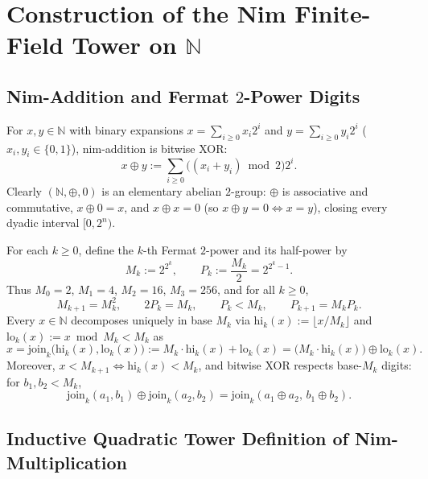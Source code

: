 \documentclass[11pt]{article}
\theoremstyle{definition}
\theoremstyle{remark}
\newcommand{\nimadd}{\oplus}
\newcommand{\N}{\mathbb{N}}
\begin{document}
\section{Construction of the Nim Finite-Field Tower on \texorpdfstring{$\N$}{N}}

\subsection{Nim-Addition and Fermat \texorpdfstring{$2$}{2}-Power Digits}

For $x, y \in \N$ with binary expansions $x = \sum_{i \ge 0} x_i 2^i$ and $y = \sum_{i \ge 0} y_i 2^i$ ($x_i, y_i \in \{0,1\}$), nim-addition is bitwise XOR:
\[
  x \nimadd y := \sum_{i \ge 0} \bigl((x_i + y_i) \bmod 2\bigr) 2^i.
\]
Clearly $(\N, \nimadd, 0)$ is an elementary abelian $2$-group: $\nimadd$ is associative and commutative, $x \nimadd 0 = x$, and $x \nimadd x = 0$ (so $x \nimadd y = 0 \iff x = y$), closing every dyadic interval $[0, 2^n)$.

For each $k \ge 0$, define the $k$-th Fermat $2$-power and its half-power by
\[
  M_k := 2^{2^k}, \qquad P_k := \frac{M_k}{2} = 2^{2^k - 1}.
\]
Thus $M_0 = 2$, $M_1 = 4$, $M_2 = 16$, $M_3 = 256$, and for all $k \ge 0$,
\begin{equation}\label{eq:MP-identities}
  M_{k+1} = M_k^2, \qquad 2 P_k = M_k, \qquad P_k < M_k, \qquad P_{k+1} = M_k P_k.
\end{equation}
Every $x \in \N$ decomposes uniquely in base $M_k$ via $\mathrm{hi}_k(x) := \lfloor x / M_k \rfloor$ and $\mathrm{lo}_k(x) := x \bmod M_k < M_k$ as
\[
  x = \mathrm{join}_k\bigl(\mathrm{hi}_k(x), \mathrm{lo}_k(x)\bigr) := M_k \cdot \mathrm{hi}_k(x) + \mathrm{lo}_k(x) = \bigl(M_k \cdot \mathrm{hi}_k(x)\bigr) \nimadd \mathrm{lo}_k(x).
\]
Moreover, $x < M_{k+1} \iff \mathrm{hi}_k(x) < M_k$, and bitwise XOR respects base-$M_k$ digits: for $b_1, b_2 < M_k$,
\begin{equation}\label{eq:join-xor}
  \mathrm{join}_k(a_1, b_1) \nimadd \mathrm{join}_k(a_2, b_2) = \mathrm{join}_k(a_1 \nimadd a_2,\, b_1 \nimadd b_2).
\end{equation}

\subsection{Inductive Quadratic Tower Definition of Nim-Multiplication}
\end{document}
